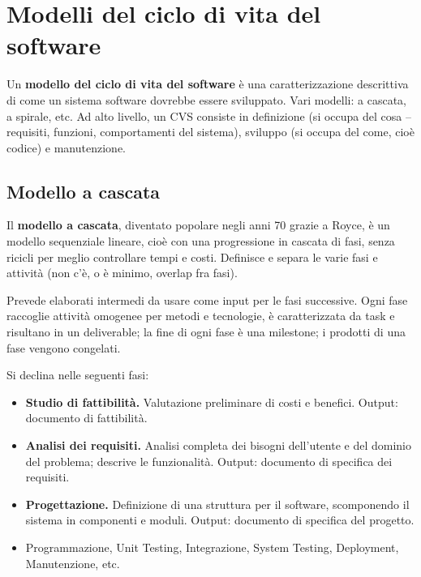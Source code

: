 \documentclass{article}
\begin{document}
\section{Modelli del ciclo di vita del software}

    Un \textbf{modello del ciclo di vita del software} è una caratterizzazione descrittiva di come un sistema software dovrebbe essere sviluppato. Vari modelli: a cascata, a spirale, etc. Ad alto livello, un CVS consiste in definizione (si occupa del cosa – requisiti, funzioni, comportamenti del sistema), sviluppo (si occupa del come, cioè codice) e manutenzione.
    
    \subsection{Modello a cascata}
    
        Il \textbf{modello a cascata}, diventato popolare negli anni 70 grazie a Royce, è un modello sequenziale lineare, cioè con una progressione in cascata di fasi, senza ricicli per meglio controllare tempi e costi. Definisce e separa le varie fasi e attività (non c’è, o è minimo, overlap fra fasi). 
        
        Prevede elaborati intermedi da usare come input per le fasi successive. Ogni fase raccoglie attività omogenee per metodi e tecnologie, è caratterizzata da task e risultano in un deliverable; la fine di ogni fase è una milestone; i prodotti di una fase vengono congelati. 
        
        \vspace{3mm}
        
        Si declina nelle seguenti fasi:
        
        \begin{itemize}
            \item \textbf{Studio di fattibilità.} Valutazione preliminare di costi e benefici. Output: documento di fattibilità.
            
            \item \textbf{Analisi dei requisiti.} Analisi completa dei bisogni dell’utente e del dominio del problema; descrive le funzionalità. Output: documento di specifica dei requisiti.
            
            \item \textbf{Progettazione.} Definizione di una struttura per il software, scomponendo il sistema in componenti e moduli. Output: documento di specifica del progetto.
            
            \item Programmazione, Unit Testing, Integrazione, System Testing, Deployment, Manutenzione, etc.
        \end{itemize}
    
\end{document}
